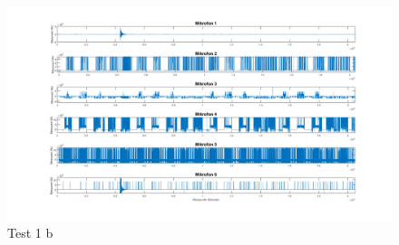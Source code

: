\begin{figure}[h]
	\begin{center}
		\includegraphics[scale=0.3]{Sections/Programmierung/Test_1_b}
	\end{center}
	\caption{Test 1 b}
	\label{fig:Test_1_b}
\end{figure}

\newpage